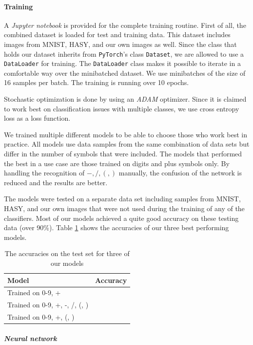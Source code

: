 \documentclass[12pt]{article}
\begin{document}
		
	\paragraph{Training}
		A \textit{Jupyter notebook} is provided for the complete training routine. First of all, the combined dataset is loaded for test and training data. This dataset includes images from MNIST, HASY, and our own images as well. Since the class that holds our dataset inherits from \texttt{PyTorch}'s class \texttt{Dataset}, we are allowed to use a \texttt{DataLoader} for training. The \texttt{DataLoader} class makes it possible to iterate in a comfortable way over the minibatched dataset. We use minibatches of the size of 16 samples per batch. The training is running over 10 epochs.
		
		Stochastic optimization is done by using an \textit{ADAM}\cite{adam} optimizer. Since it is claimed to work best on classification issues with multiple classes, we use cross entropy loss as a loss function.
		
		We trained multiple different models to be able to choose those who work best in practice. All models use data samples from the same combination of data sets but differ in the number of symbols that were included. The models that performed the best in a use case are those trained on digits and plus symbols only. By handling the recognition of $-, /, (, )$ manually, the confusion of the network is reduced and the results are better. 
		
		The models were tested on a separate data set including samples from MNIST, HASY, and our own images that were not used during the training of any of the classifiers. Most of our models achieved a quite good accuracy on these testing data (over 90\%). Table \ref{tab:accuracies} shows the accuracies of our three best performing models.
		\begin{table}[H]
			\begin{tabular}{l|l}
				\textbf{Model} & \textbf{Accuracy} \\
				\hline
				Trained on 0-9, + & \\
				\hline
				Trained on 0-9, +, -, /, (, ) & \\
				\hline
				Trained on 0-9, +, (, ) &
			\end{tabular}
			\caption{The accuracies on the test set for three of our models}
			\label{tab:accuracies}
		\end{table}
				
		\subparagraph{Neural network}
		
\end{document}
